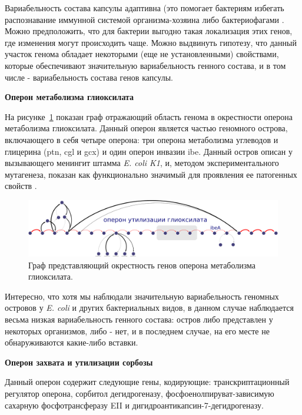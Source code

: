 Вариабельность состава капсулы адаптивна (это помогает бактериям избегать распознавание иммунной системой организма-хозяина либо бактериофагами \cite{cress2014masquerading, lukavcova2008role}. Можно предположить, что для бактерии выгодно такая локализация этих генов, где изменения могут происходить чаще. Можно выдвинуть гипотезу, что данный участок генома обладает некоторыми (еще не установленными) свойствами, которые обеспечивают значительную вариабельность генного состава, и в том числе - вариабельность состава генов капсулы.

\textbf{Оперон метаболизма глиоксилата}

На рисунке~\ref{img:glioxilate} показан граф отражающий область генома в окрестности оперона метаболизма глиоксилата. Данный оперон является частью геномного острова, включающего в себя четыре оперона: три оперона метаболизма углеводов и глицерина (ptn, cgl и gcx) и один оперон инвазии ibe. Данный остров описан у вызывающего менингит штамма \textit{E. coli K1}, и, методом экспериментального мутагенеза, показан как функционально значимый для проявления ее патогенных свойств \cite{huang2001novel}. 

\begin{figure}[!ht] 
  \center
    \includegraphics[width=\textwidth]{Dissertation/images/subgraphs/glyoxilate_metabolism_operon_crop.png}
  \caption{Граф представляющий окрестность генов оперона метаболизма глиоксилата. }
  \label{img:glioxilate} 
\end{figure}


Интересно, что хотя мы наблюдали значительную вариабельность геномных островов у \textit{E. coli} и других бактериальных видов, в данном случае наблюдается весьма низкая вариабельность генного состава: остров либо представлен у некоторых организмов, либо - нет, и в последнем случае, на его месте не обнаруживаются какие-либо вставки.

\textbf{Оперон захвата и утилизации сорбозы}

Данный оперон содержит следующие гены, кодирующие: транскриптационный регулятор оперона, сорбитол дегидрогеназу, фосфоенолпируват-зависимую сахарную фосфотрансферазу EII и дигидроантикапсин-7-дегидрогеназу.

